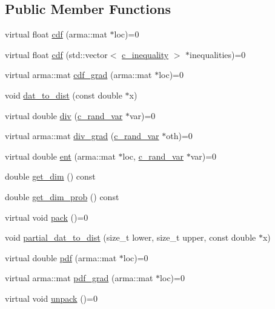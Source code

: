 \subsection*{\-Public \-Member \-Functions}
\begin{DoxyCompactItemize}
\item 
virtual float \hyperlink{classdivopt_1_1c__rand__var_a04962b760cf8d3b62cecaf84db8888d6}{cdf} (arma\-::mat $\ast$loc)=0
\item 
virtual float \hyperlink{classdivopt_1_1c__rand__var_a4ae3877a3c46cacee48c48f7effac56b}{cdf} (std\-::vector$<$ \hyperlink{classdivopt_1_1c__inequality}{c\-\_\-inequality} $>$ $\ast$inequalities)=0
\item 
virtual arma\-::mat \hyperlink{classdivopt_1_1c__rand__var_a98aad18751922552e96d1808745b34d6}{cdf\-\_\-grad} (arma\-::mat $\ast$loc)=0
\item 
void \hyperlink{classdivopt_1_1c__rand__var_a45fac8707b07c02eb2e6ea0fff47994a}{dat\-\_\-to\-\_\-dist} (const double $\ast$x)
\item 
virtual double \hyperlink{classdivopt_1_1c__rand__var_a921fa0ba7a22c97cc0594888d221e379}{div} (\hyperlink{classdivopt_1_1c__rand__var}{c\-\_\-rand\-\_\-var} $\ast$var)=0
\item 
virtual arma\-::mat \hyperlink{classdivopt_1_1c__rand__var_a88c4e86c9ee59bd5a93a59e57442ec5c}{div\-\_\-grad} (\hyperlink{classdivopt_1_1c__rand__var}{c\-\_\-rand\-\_\-var} $\ast$oth)=0
\item 
virtual double \hyperlink{classdivopt_1_1c__rand__var_a8671b4803b5b589eed65f8c2c4008dff}{ent} (arma\-::mat $\ast$loc, \hyperlink{classdivopt_1_1c__rand__var}{c\-\_\-rand\-\_\-var} $\ast$var)=0
\item 
double \hyperlink{classdivopt_1_1c__rand__var_ae2463f769d55c59961d9a82e8ef318b2}{get\-\_\-dim} () const 
\item 
double \hyperlink{classdivopt_1_1c__rand__var_aef27f4c3b3b2f9a77d7ee6576c064525}{get\-\_\-dim\-\_\-prob} () const 
\item 
virtual void \hyperlink{classdivopt_1_1c__rand__var_a5dfd6f96919dc469f93d6d4341cb4cd2}{pack} ()=0
\item 
void \hyperlink{classdivopt_1_1c__rand__var_a5ddef49beaa10e3dfd0e6e58af104c19}{partial\-\_\-dat\-\_\-to\-\_\-dist} (size\-\_\-t lower, size\-\_\-t upper, const double $\ast$x)
\item 
virtual double \hyperlink{classdivopt_1_1c__rand__var_a631139ddccf1de90af2b8cb9a7f6d50a}{pdf} (arma\-::mat $\ast$loc)=0
\item 
virtual arma\-::mat \hyperlink{classdivopt_1_1c__rand__var_a6fa8732f6467cfb9b71b9590c2f88e5b}{pdf\-\_\-grad} (arma\-::mat $\ast$loc)=0
\item 
virtual void \hyperlink{classdivopt_1_1c__rand__var_af2b87125538d2ccf2fd427d104c5397d}{unpack} ()=0
\end{DoxyCompactItemize}
